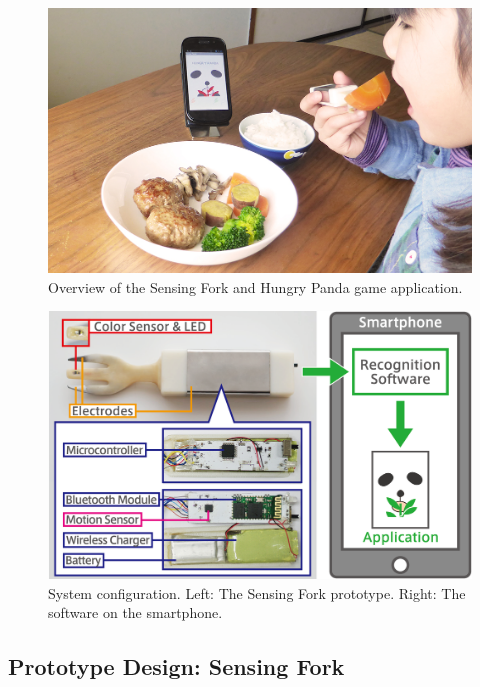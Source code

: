 \begin{figure}[t]
\begin{center}
\includegraphics[width=14cm]{image/figure01-light.jpg}
\caption{Overview of the Sensing Fork and Hungry Panda game application.}
\label{overview}
\end{center}
\end{figure}

\begin{figure}[t]
\begin{center}
\includegraphics[width=14cm]{image/systemzu02-02.png}
\caption{System configuration. Left: The Sensing Fork prototype. Right: The software on the smartphone.}
\label{system}
\end{center}
\end{figure}

\subsection{Prototype Design: Sensing Fork}
